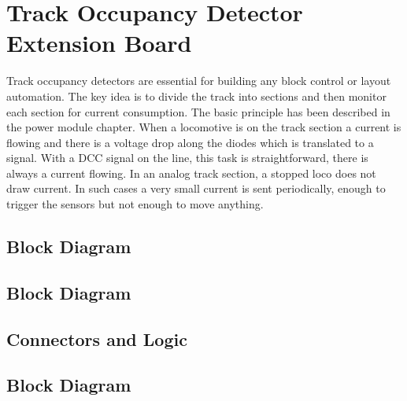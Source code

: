 \chapter{Track Occupancy Detector Extension Board}

Track occupancy detectors are essential for building any block control or layout automation. The key idea is to divide the track into sections and then monitor each section for current consumption. The basic principle has been described in the power module chapter. When a locomotive is on the track section a current is flowing and there is a voltage drop along the diodes which is translated to a signal. With a DCC signal on the line, this task is straightforward, there is always a current flowing. In an analog track section, a stopped loco does not draw current. In such cases a very small current is sent periodically, enough to trigger the sensors but not enough to move anything.

\section{Block Diagram}

\section{Block Diagram}


\section{Connectors and Logic}

\section{Block Diagram}


